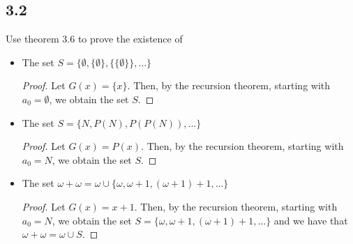 \subsection*{3.2} Use theorem 3.6 to prove the existence of

\begin{itemize}
    \item The set $S = \{\emptyset, \{\emptyset\}, \{\{\emptyset\}\}, \dots \}$
    \begin{proof}
        Let $G(x) = \{x\}$. Then, by the recursion theorem, starting with $a_0 = \emptyset$, we obtain the set $S$.
    \end{proof}

    \item The set $S = \{N, P(N), P(P(N)), \dots\}$
    \begin{proof}
        Let $G(x) = P(x)$. Then, by the recursion theorem, starting with $a_0 = N$, we obtain the set $S$.
    \end{proof}

    \item The set $\omega + \omega = \omega \cup \{\omega, \omega + 1, (\omega + 1) + 1, \dots\}$
    \begin{proof}
        Let $G(x) = x + 1$. Then, by the recursion theorem, starting with $a_0 = N$, we obtain the set $S = \{\omega, \omega + 1, (\omega + 1) + 1, \dots\}$ and we have that $\omega + \omega = \omega \cup S$.
    \end{proof}
\end{itemize}

